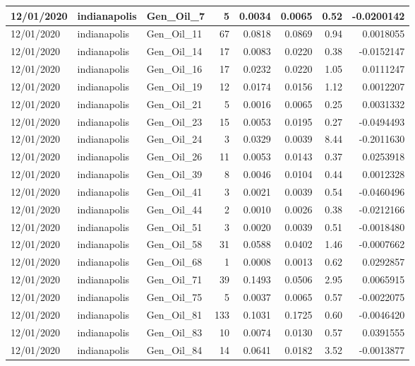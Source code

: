 \documentclass[
  letterpaper,
  DIV=11,
  numbers=noendperiod]{scrartcl}
\begin{document}
\begin{tabular}{l|l|l|r|r|r|r|r}
\hline
12/01/2020 & indianapolis & Gen\_Oil\_7 & 5 & 0.0034 & 0.0065 & 0.52 & -0.0200142\\
\hline
12/01/2020 & indianapolis & Gen\_Oil\_11 & 67 & 0.0818 & 0.0869 & 0.94 & 0.0018055\\
\hline
12/01/2020 & indianapolis & Gen\_Oil\_14 & 17 & 0.0083 & 0.0220 & 0.38 & -0.0152147\\
\hline
12/01/2020 & indianapolis & Gen\_Oil\_16 & 17 & 0.0232 & 0.0220 & 1.05 & 0.0111247\\
\hline
12/01/2020 & indianapolis & Gen\_Oil\_19 & 12 & 0.0174 & 0.0156 & 1.12 & 0.0012207\\
\hline
12/01/2020 & indianapolis & Gen\_Oil\_21 & 5 & 0.0016 & 0.0065 & 0.25 & 0.0031332\\
\hline
12/01/2020 & indianapolis & Gen\_Oil\_23 & 15 & 0.0053 & 0.0195 & 0.27 & -0.0494493\\
\hline
12/01/2020 & indianapolis & Gen\_Oil\_24 & 3 & 0.0329 & 0.0039 & 8.44 & -0.2011630\\
\hline
12/01/2020 & indianapolis & Gen\_Oil\_26 & 11 & 0.0053 & 0.0143 & 0.37 & 0.0253918\\
\hline
12/01/2020 & indianapolis & Gen\_Oil\_39 & 8 & 0.0046 & 0.0104 & 0.44 & 0.0012328\\
\hline
12/01/2020 & indianapolis & Gen\_Oil\_41 & 3 & 0.0021 & 0.0039 & 0.54 & -0.0460496\\
\hline
12/01/2020 & indianapolis & Gen\_Oil\_44 & 2 & 0.0010 & 0.0026 & 0.38 & -0.0212166\\
\hline
12/01/2020 & indianapolis & Gen\_Oil\_51 & 3 & 0.0020 & 0.0039 & 0.51 & -0.0018480\\
\hline
12/01/2020 & indianapolis & Gen\_Oil\_58 & 31 & 0.0588 & 0.0402 & 1.46 & -0.0007662\\
\hline
12/01/2020 & indianapolis & Gen\_Oil\_68 & 1 & 0.0008 & 0.0013 & 0.62 & 0.0292857\\
\hline
12/01/2020 & indianapolis & Gen\_Oil\_71 & 39 & 0.1493 & 0.0506 & 2.95 & 0.0065915\\
\hline
12/01/2020 & indianapolis & Gen\_Oil\_75 & 5 & 0.0037 & 0.0065 & 0.57 & -0.0022075\\
\hline
12/01/2020 & indianapolis & Gen\_Oil\_81 & 133 & 0.1031 & 0.1725 & 0.60 & -0.0046420\\
\hline
12/01/2020 & indianapolis & Gen\_Oil\_83 & 10 & 0.0074 & 0.0130 & 0.57 & 0.0391555\\
\hline
12/01/2020 & indianapolis & Gen\_Oil\_84 & 14 & 0.0641 & 0.0182 & 3.52 & -0.0013877\\

\end{tabular}
\end{document}
